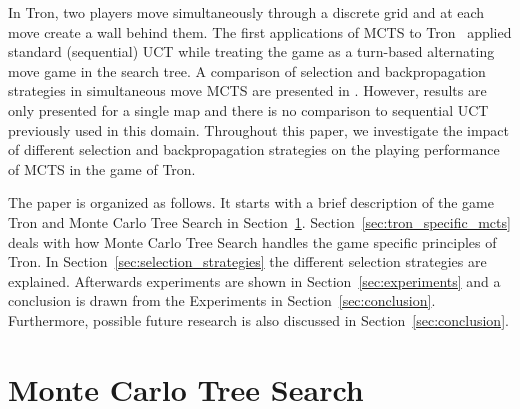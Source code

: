 \documentclass{article}
\begin{document}
In Tron, two players move simultaneously through a discrete grid and at each move create a wall behind them. 
The first applications of MCTS to Tron~\cite{tron_cig,teuling_tron} applied standard (sequential) UCT while treating the game as a turn-based alternating move game in the search tree. A comparison of selection and backpropagation strategies in simultaneous move MCTS are presented in \cite{cig_paper}. However, results are only presented for a single map and there is no comparison to sequential UCT previously used in this domain.
Throughout this paper, we investigate the impact of different selection and backpropagation strategies on the playing performance of MCTS in the game of Tron.

The paper is organized as follows.
It starts with a brief description of the game Tron and Monte Carlo Tree Search in Section~\ref{sec:background}. 
Section~\ref{sec:tron_specific_mcts} deals with how Monte Carlo Tree Search handles the game specific principles of Tron. In Section~\ref{sec:selection_strategies} the different selection strategies are explained. Afterwards experiments are shown in Section~\ref{sec:experiments} and a conclusion is drawn from the Experiments in Section~\ref{sec:conclusion}. Furthermore, possible future research is also discussed in Section~\ref{sec:conclusion}.

\section{Monte Carlo Tree Search}
\label{sec:background}
\end{document}
